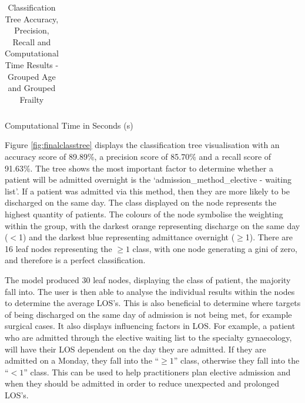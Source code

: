 \documentclass[../thesis.tex]{subfiles}
\begin{document}
\begin{table}[h!]
\begin{subtable}{.49\linewidth}
{\begin{tabular}{ccx{1.6cm}x{1.6cm}x{1.6cm}x{1.6cm}x{1.6cm}x{1.6cm}}
    \end{tabular}}
    \caption{Computational Time in Seconds (s)}
    \label{tab:classtree6d}

\end{subtable}

\label{tab:classtree5}
\caption{Classification Tree Accuracy, Precision, Recall and Computational Time Results - Grouped Age and Grouped Frailty}
\end{table}


Figure \ref{fig:finalclasstree} displays the classification tree visualisation with an accuracy score of 89.89\%, a precision score of 85.70\% and a recall score of 91.63\%. The tree shows the most important factor to determine whether a patient will be admitted overnight is the `admission\_method\_elective - waiting list'. If a patient was admitted via this method, then they are more likely to be discharged on the same day. The class displayed on the node represents the highest quantity of patients. The colours of the node symbolise the weighting within the group, with the darkest orange representing discharge on the same day ($<$1) and the darkest blue representing admittance overnight ($\geq$1). There are 16 leaf nodes representing the $\geq1$ class, with one node generating a gini of zero, and therefore is a perfect classification.

The model produced 30 leaf nodes, displaying the class of patient, the majority fall into. The user is then able to analyse the individual results within the nodes to determine the average LOS's. This is also beneficial to determine where targets of being discharged on the same day of admission is not being met, for example surgical cases. It also displays influencing factors in LOS. For example, a patient who are admitted through the elective waiting list to the specialty gynaecology, will have their LOS dependent on the day they are admitted. If they are admitted on a Monday, they fall into the ``$\geq1$'' class, otherwise they fall into the ``$<1$'' class. This can be used to help practitioners plan elective admission and when they should be admitted in order to reduce unexpected and prolonged LOS's.
\end{document}
